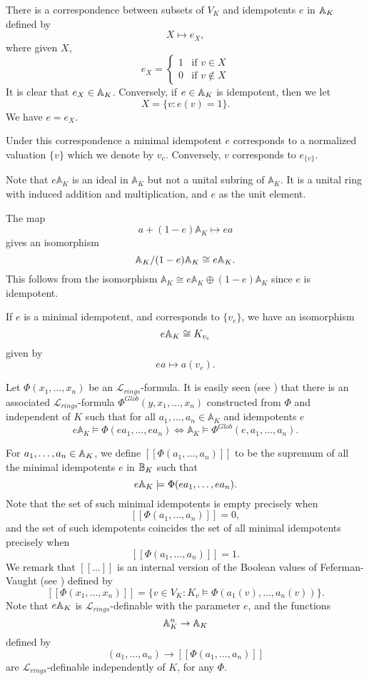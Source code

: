 \documentclass[12pt]{amsart}
\def\A{\mathbb{A}}
\def\cL{\mathcal{L}}
\def\cL{\mathcal{L}}
\numberwithin{equation}{section}
\begin{document}
There is a correspondence between subsets of $V_K$ and 
idempotents $e$ in $\Bbb A_K$ defined by 
$$X \longmapsto e_X,$$
where given $X$,  
$$e_X=\begin{cases}
1 & \text{if~$v\in X$}\\
0 & \text{if~$v\notin X$}
\end{cases}$$
It is clear that $e_X\in \Bbb A_K$. Conversely, 
if $e\in \Bbb A_K$ is idempotent, then we let 
$$X=\{v: e(v)=1\}.$$ We have $e=e_{X}.$

Under this correspondence a minimal idempotent $e$ corresponds to a normalized valuation $\{v\}$ which we denote by $v_e$. Conversely,
$v$ corresponds to $e_{\{v\}}$. 

Note that $e\A_K$ is an ideal in $\A_K$ but not a unital subring of $\A_K$. It is a unital ring with induced addition and multiplication, and $e$ as the unit element. 

The map
$$a+(1-e)\A_K \mapsto ea$$
gives an isomorphism 
$$\Bbb A_K/(1-e)\Bbb A_K \cong e\Bbb A_K.$$
This follows from the isomorphism $\A_K\cong e\A_K \oplus (1-e)\A_K$ since $e$ is idempotent. 

If $e$ is a minimal idempotent, and corresponds to $\{v_e\}$, we have an isomorphism 
$$e\Bbb A_K\cong K_{v_e}$$
given by $$ea \mapsto a(v_{e}).$$

Let $\Phi(x_1,\dots,x_n)$ be an $\cL_{rings}$-formula. It is easily seen (see \cite{DM-ad}) that there is an associated $\cL_{rings}$-formula $\Phi^{Glob}(y,x_1,\dots,x_n)$ 
constructed from $\Phi$ and independent of $K$ such that for all $a_1,\dots,a_n \in \A_K$ and idempotents $e$
$$e\A_K \models \Phi(ea_1,\dots,ea_n) \Leftrightarrow \A_K\models \Phi^{Glob}(e,a_1,\dots,a_n).$$

For $a_1,\dots,a_n\in \Bbb A_K$, we define $[[\Phi(a_1,\dots,a_n)]]$ to be the supremum of all the minimal idempotents $e$ in $\Bbb B_K$ such that 
$$e\Bbb A_K \models \Phi(ea_1,\dots,ea_n).$$
Note that the set of such minimal idempotents is empty precisely when   
$$[[\Phi(a_1,\dots,a_n)]]=0,$$
and the set of such idempotents coincides the set of all minimal idempotents precisely when 
$$[[\Phi(a_1,\dots,a_n)]]=1.$$
We remark that $[[...]]$ is an internal version of the Boolean values of Feferman-Vaught (see \cite{FV}) defined by 
$$[[\Phi(x_1,\dots,x_n)]]=\{v\in V_K: K_v\models \Phi(a_1(v),\dots,a_n(v))\}.$$
Note that $e\Bbb A_K$ is $\cL_{rings}$-definable with the parameter $e$, and the functions 
$$\Bbb A_K^n\rightarrow \Bbb A_K$$
defined by 
$$(a_1,\dots,a_n)\rightarrow [[\Phi(a_1,\dots,a_n)]]$$ 
are $\cL_{rings}$-definable independently of $K$, for any $\Phi$. 
\end{document}
